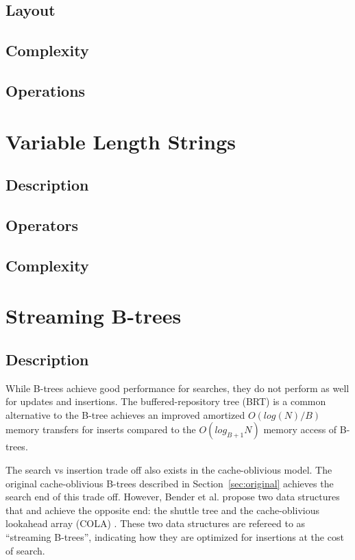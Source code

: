 \documentclass{style}
\begin{document}
\subsection{Layout}
\label{sec:layout}

\subsection{Complexity}

\subsection{Operations}

\section{Variable Length Strings}

\subsection{Description}

\subsection{Operators}

\subsection{Complexity}

\section{Streaming B-trees}

\subsection{Description}

While B-trees achieve good performance for searches, they do not perform as
well for updates and insertions. The buffered-repository tree (BRT) is a
common alternative to the B-tree achieves an improved amortized $O(log(N)/B)$
memory transfers for inserts compared to the $O(log_{B+1}N)$ memory access of
B-trees.

The search vs insertion trade off also exists in the cache-oblivious model.
The original cache-oblivious B-trees described in Section~\ref{sec:original}
achieves the search end of this trade off. However, Bender et al. propose two
data structures that and achieve the opposite end: the shuttle tree and the
cache-oblivious lookahead array (COLA) \cite{BenderFaFi07}. These two data
structures are refereed to as ``streaming B-trees'', indicating how they are
optimized for insertions at the cost of search.
\end{document}
